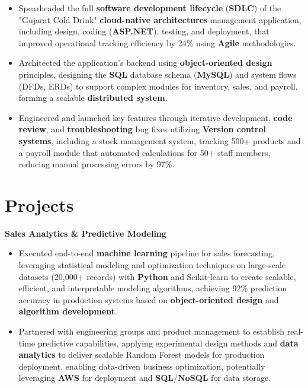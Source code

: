 \documentclass[a4paper,10pt]{article}
\begin{document}
\begin{itemize}[leftmargin=*, itemsep=0pt, parsep=1pt] %
\vspace{-7mm}
    \item Spearheaded the full \textbf{software development lifecycle} (\textbf{SDLC}) of the "Gujarat Cold Drink" \textbf{cloud-native architectures} management application, including design, coding (\textbf{ASP.NET}), testing, and deployment, that improved operational tracking efficiency by 24\% using \textbf{Agile} methodologies.
\item Architected the application's backend using \textbf{object-oriented design} principles, designing the \textbf{SQL} database schema (\textbf{MySQL}) and system flows (DFDs, ERDs) to support complex modules for inventory, sales, and payroll, forming a scalable \textbf{distributed system}.
\item Engineered and launched key features through iterative development, \textbf{code review}, and \textbf{troubleshooting} bug fixes utilizing \textbf{Version control systems}, including a stock management system, tracking 500+ products and a payroll module that automated calculations for 50+ staff members, reducing manual processing errors by 97\%. 

\end{itemize}

\vspace{-4mm}

\section*{Projects}
\textbf{Sales Analytics \& Predictive Modeling} \\
\begin{itemize}[leftmargin=*, itemsep=0pt, parsep=1pt]
\vspace{-7mm}
    \item Executed end-to-end \textbf{machine learning} pipeline for sales forecasting, leveraging statistical modeling and optimization techniques on large-scale datasets (20,000+ records) with \textbf{Python} and Scikit-learn to create scalable, efficient, and interpretable modeling algorithms, achieving 92\% prediction accuracy in production systems based on \textbf{object-oriented design} and \textbf{algorithm development}.
    \item Partnered with engineering groups and product management to establish real-time predictive capabilities, applying experimental design methods and \textbf{data analytics} to deliver scalable Random Forest models for production deployment, enabling data-driven business optimization, potentially leveraging \textbf{AWS} for deployment and \textbf{SQL}/\textbf{NoSQL} for data storage.
    \end{itemize}
\end{document}
